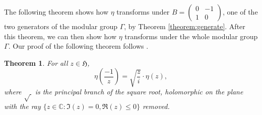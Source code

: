 \documentclass{article}
\newtheorem{theorem}{Theorem}
\begin{document}
The following theorem shows how $\eta$ transforms under $B=\begin{pmatrix}0&-1\\1&0\end{pmatrix}$, one of the two generators of the modular group $\Gamma$, by Theorem \ref{theorem:generate}. After this theorem, we can then show how $\eta$ transforms under the whole modular group $\Gamma$.
Our proof of the following theorem follows \cite[Theorem 2, Chapter VIII]{MR808396}.

\begin{theorem}
\label{thm:eta}
For all $z \in \mathfrak{H}$,
\[
\eta(\frac{-1}{z})=\sqrt{\frac{z}{i}} \cdot \eta(z),
\]
where $\sqrt{\,}$ is the principal branch of the square root, holomorphic on the plane with the ray $\{z \in \mathbb{C}:\Im(z)=0, \Re(z) \leq 0\}$ removed.
\end{theorem}
\end{document}
